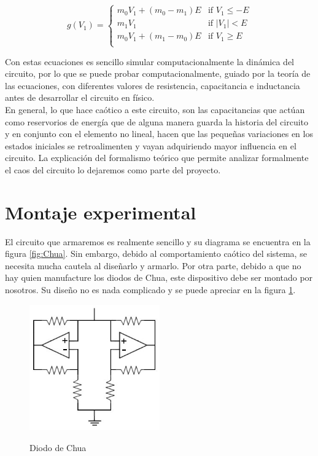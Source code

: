\documentclass[%
 reprint,
%
 amsmath,amssymb,
 aps,
]{revtex4-1}
\begin{document}
$$
g(V_1) =
\left\{
	\begin{array}{lll}
		 m_0 V_1 + (m_0 - m_1)E  & \mbox{if } V_1 \leq -E \\
		 m_1 V_1	 & \mbox{if }  |V_1| < E \\
		 m_0 V_1 + (m_1 - m_0)E  & \mbox{if } V_1 \geq E \\

		 
	\end{array}
\right.
$$

Con estas ecuaciones es sencillo simular computacionalmente la dinámica del circuito, por lo que se puede probar computacionalmente, guiado por la teoría de las ecuaciones, con diferentes valores de resistencia, capacitancia e inductancia antes de desarrollar el circuito en físico. \\

En general, lo que hace caótico a este circuito, son las capacitancias que actúan como reservorios de energía que de alguna manera guarda la historia del circuito y en conjunto con el elemento no lineal, hacen que las pequeñas variaciones en los estados iniciales se retroalimenten y vayan adquiriendo mayor influencia en el circuito. La explicación del formalismo teórico que permite analizar formalmente el caos del circuito lo dejaremos como parte del proyecto.

\section{\label{sec:level1}Montaje experimental}
El circuito que armaremos es realmente sencillo y su diagrama se encuentra en la figura \ref{fig:Chua}. Sin embargo, debido al comportamiento caótico del sistema, se necesita mucha cautela al diseñarlo y armarlo. Por otra parte, debido a que no hay quien manufacture los diodos de Chua, este dispositivo debe ser montado por nosotros. Su diseño no es nada complicado y se puede apreciar en la figura \ref{fig:diodo}\cite{Website}. \\

\begin{figure}[h!]
\caption{Diodo de Chua}
\centering
\includegraphics[width=0.5\textwidth]{diodo}
\label{fig:diodo}
\end{figure}
\end{document}
